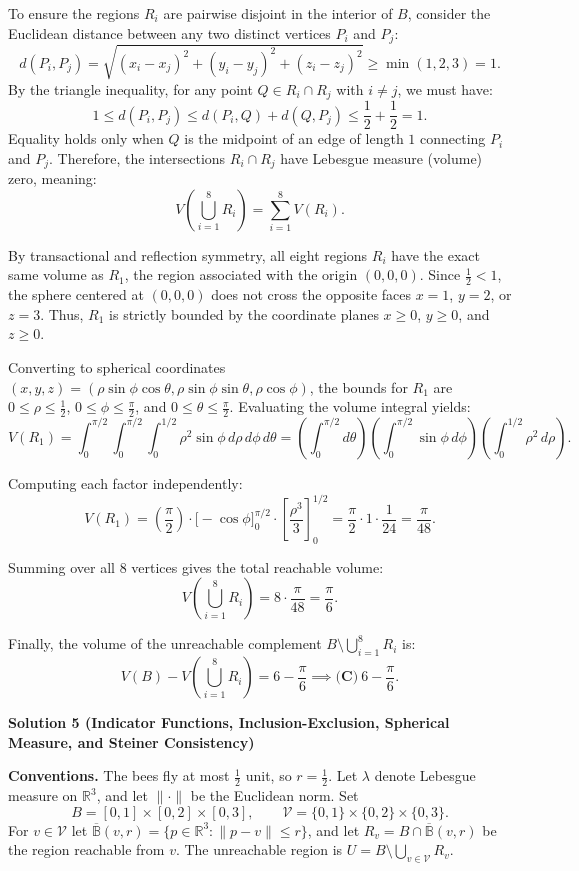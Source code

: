 \begin{enumerate}
 To ensure the regions $R_i$ are pairwise disjoint in the interior of $B$, consider the Euclidean distance between any two distinct vertices $P_i$ and $P_j$:
 \[d(P_i, P_j) = \sqrt{(x_i - x_j)^2 + (y_i - y_j)^2 + (z_i - z_j)^2} \geq \min(1, 2, 3) = 1.\]By the triangle inequality, for any point $Q \in R_i \cap R_j$ with $i \neq j$, we must have:
 \[1 \leq d(P_i, P_j) \leq d(P_i, Q) + d(Q, P_j) \leq \frac{1}{2} + \frac{1}{2} = 1.\]Equality holds only when $Q$ is the midpoint of an edge of length $1$ connecting $P_i$ and $P_j$. Therefore, the intersections $R_i \cap R_j$ have Lebesgue measure (volume) zero, meaning:
 \[V\left(\bigcup_{i=1}^8 R_i\right) = \sum_{i=1}^8 V(R_i).\]

 
By transactional and reflection symmetry, all eight regions $R_i$ have the exact same volume as $R_1$, the region associated with the origin $(0,0,0)$. Since $\frac{1}{2} < 1$, the sphere centered at $(0,0,0)$ does not cross the opposite faces $x=1$, $y=2$, or $z=3$. Thus, $R_1$ is strictly bounded by the coordinate planes $x \geq 0$, $y \geq 0$, and $z \geq 0$.

 Converting to spherical coordinates $(x, y, z) = (\rho \sin\phi \cos\theta, \rho \sin\phi \sin\theta, \rho \cos\phi)$, the bounds for $R_1$ are $0 \leq \rho \leq \frac{1}{2}$, $0 \leq \phi \leq \frac{\pi}{2}$, and $0 \leq \theta \leq \frac{\pi}{2}$. Evaluating the volume integral yields:
 \[V(R_1) = \int_0^{\pi/2} \int_0^{\pi/2} \int_0^{1/2} \rho^2 \sin\phi \, d\rho \, d\phi \, d\theta = \left(\int_0^{\pi/2} d\theta\right) \left(\int_0^{\pi/2} \sin\phi \, d\phi\right) \left(\int_0^{1/2} \rho^2 \, d\rho\right).\]

 Computing each factor independently:
 \[V(R_1) = \left(\frac{\pi}{2}\right) \cdot \Big[-\cos\phi\Big]_0^{\pi/2} \cdot \left[\frac{\rho^3}{3}\right]_0^{1/2} = \frac{\pi}{2} \cdot 1 \cdot \frac{1}{24} = \frac{\pi}{48}.\]

 Summing over all $8$ vertices gives the total reachable volume:
 \[V\left(\bigcup_{i=1}^8 R_i\right) = 8 \cdot \frac{\pi}{48} = \frac{\pi}{6}.\]

 Finally, the volume of the unreachable complement $B \setminus \bigcup_{i=1}^8 R_i$ is:
 \[V(B) - V\left(\bigcup_{i=1}^8 R_i\right) = 6 - \frac{\pi}{6} \implies \boxed{\textbf{(C)}\ 6 - \frac{\pi}{6}}.\]




\textbf{Solution 5 (Indicator Functions, Inclusion-Exclusion, Spherical Measure, and Steiner Consistency)}

\textbf{Conventions.} The bees fly at most $\frac12$ unit, so $r=\frac12$. Let $\lambda$ denote Lebesgue measure on $\mathbb{R}^3$, and let $\|\cdot\|$ be the Euclidean norm. Set
 \[B=[0,1]\times[0,2]\times[0,3],\qquad \mathcal{V}=\{0,1\}\times\{0,2\}\times\{0,3\}.\]For $v\in\mathcal{V}$ let $\overline{\mathbb{B}}(v,r)=\{p\in\mathbb{R}^3:\|p-v\|\le r\}$, and let $R_v=B\cap\overline{\mathbb{B}}(v,r)$ be the region reachable from $v$. The unreachable region is $U=B\setminus\bigcup_{v\in\mathcal{V}}R_v$.


\end{enumerate}
